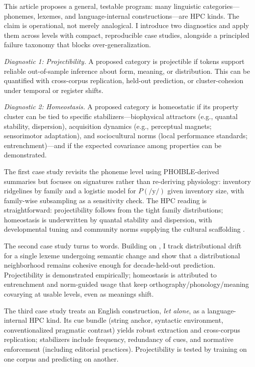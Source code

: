 \documentclass[12pt]{article}
\begin{document}
This article proposes a general, testable program: many linguistic categories---phonemes, lexemes, and language-internal constructions---are HPC kinds. The claim is operational, not merely analogical. I introduce two diagnostics and apply them across levels with compact, reproducible case studies, alongside a principled failure taxonomy that blocks over-generalization.

\emph{Diagnostic 1: Projectibility.} A proposed category is projectible if tokens support reliable out-of-sample inference about form, meaning, or distribution. This can be quantified with cross-corpus replication, held-out prediction, or cluster-cohesion under temporal or register shifts.

\emph{Diagnostic 2: Homeostasis.} A proposed category is homeostatic if its property cluster can be tied to specific stabilizers---biophysical attractors (e.g., quantal stability, dispersion), acquisition dynamics (e.g., perceptual magnets; sensorimotor adaptation), and sociocultural norms (local performance standards; entrenchment)---and if the expected covariance among properties can be demonstrated.

The first case study revisits the phoneme level using PHOIBLE-derived summaries but focuses on signatures rather than re-deriving physiology: inventory ridgelines by family and a logistic model for $P(\text{/y/})$ given inventory size, with family-wise subsampling as a sensitivity check. The HPC reading is straightforward: projectibility follows from the tight family distributions; homeostasis is underwritten by quantal stability and dispersion, with developmental tuning and community norms supplying the cultural scaffolding \citep{Ekstrom2025PhonemeTool}.

The second case study turns to words. Building on \citet{Miller2021WordsSpeciesKinds}, I track distributional drift for a single lexeme undergoing semantic change and show that a distributional neighborhood remains cohesive enough for decade-held-out prediction. Projectibility is demonstrated empirically; homeostasis is attributed to entrenchment and norm-guided usage that keep orthography/phonology/meaning covarying at usable levels, even as meanings shift.

The third case study treats an English construction, \emph{let alone}, as a language-internal HPC kind. Its cue bundle (string anchor, syntactic environment, conventionalized pragmatic contrast) yields robust extraction and cross-corpus replication; stabilizers include frequency, redundancy of cues, and normative enforcement (including editorial practices). Projectibility is tested by training on one corpus and predicting on another.
\end{document}
